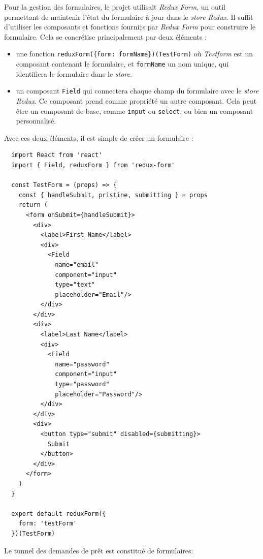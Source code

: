 \documentclass[12pt,a4paper]{article}
\providecommand{\tightlist}{%
  \setlength{\itemsep}{0pt}\setlength{\parskip}{0pt}}
\begin{document}
  \bigskip

  Pour la gestion des formulaires, le projet utilisait \emph{Redux Form},
  un outil permettant de maintenir l'état du formulaire à jour dans le
  \emph{store Redux}. Il suffit d'utiliser les composants et fonctions
  fourni‡s par \emph{Redux Form} pour construire le formulaire. Cela se
  concrétise principalement par deux éléments :

  \begin{itemize}
  \tightlist
  \item
    une fonction
    \texttt{reduxForm(\{form:\ \textquotesingle{}formName\textquotesingle{}\})(TestForm)}
    où \emph{Testform} est un composant contenant le formulaire, et
    \texttt{formName} un nom unique, qui identifiera le formulaire dans le
    \emph{store}.
  \item
    un composant \texttt{Field} qui connectera chaque champ du formulaire
    avec le \emph{store Redux}. Ce composant prend comme propriété un
    autre composant. Cela peut être un composant de base, comme
    \texttt{input} ou \texttt{select}, ou bien un composant personnalisé.
  \end{itemize}

  Avec ces deux éléments, il est simple de créer un formulaire :

  \begin{verbatim}
  import React from 'react'
  import { Field, reduxForm } from 'redux-form'

  const TestForm = (props) => {
    const { handleSubmit, pristine, submitting } = props
    return (
      <form onSubmit={handleSubmit}>
        <div>
          <label>First Name</label>
          <div>
            <Field
              name="email"
              component="input"
              type="text"
              placeholder="Email"/>
          </div>
        </div>
        <div>
          <label>Last Name</label>
          <div>
            <Field
              name="password"
              component="input"
              type="password"
              placeholder="Password"/>
          </div>
        </div>
        <div>
          <button type="submit" disabled={submitting}>
            Submit
          </button>
        </div>
      </form>
    )
  }

  export default reduxForm({
    form: 'testForm'
  })(TestForm)
  \end{verbatim}

  \bigskip

  Le tunnel des demandes de prêt est constitué de formulaires:
\end{document}
